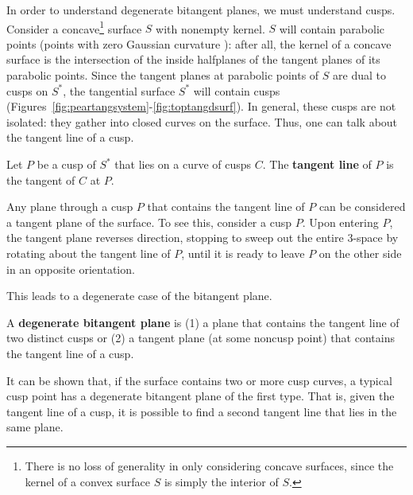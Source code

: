 \documentclass[12pt]{article}
\begin{document}
In order to understand degenerate bitangent planes, we must understand cusps.
Consider a concave\footnote{There is no loss of generality in only 
	considering concave surfaces,
	since the kernel of a convex surface $S$ is simply the interior of $S$.}
surface $S$ with nonempty kernel.
$S$ will contain parabolic points (points with zero Gaussian curvature \cite{struik}):
after all, the kernel of a concave surface is the intersection of the inside
halfplanes of the tangent planes of its parabolic points.
Since the tangent planes at parabolic points of $S$ are dual to cusps on $S^*$,
the tangential surface $S^*$ will contain cusps 
(Figures~\ref{fig:peartangsystem}-\ref{fig:toptangdsurf}).
In general, these cusps are not isolated: they gather into closed curves on the surface.
Thus, one can talk about the tangent line of a cusp.

\begin{defn2}
\label{defn:tangline}
Let $P$ be a cusp of $S^*$ that lies on a curve of cusps $C$.
The {\bf tangent line} of $P$ is the tangent of $C$ at $P$.
\end{defn2}

Any plane through a cusp $P$ that contains the tangent line of $P$ can be considered
a tangent plane of the surface.
To see this, consider a cusp $P$.
Upon entering $P$, the tangent plane reverses direction, stopping to sweep
out the entire 3-space by rotating about the tangent line of $P$,
until it is ready to leave $P$ on the other side in an opposite orientation.

This leads to a degenerate case of the bitangent plane.

\begin{defn2}
A {\bf degenerate bitangent plane} is 
(1) a plane that contains the tangent line of two distinct cusps or
(2) a tangent plane (at some noncusp point) that contains the tangent line of a cusp. 
\end{defn2}

It can be shown that, if the surface contains two or more cusp curves,
a typical cusp point has a degenerate bitangent plane of the first type.
That is, given the tangent line of a cusp, 
it is possible to find a second tangent line that lies in the same plane.
\end{document}
